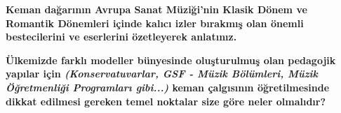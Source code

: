 \documentclass[a4paper,addpoints,12pt]{exam}
\begin{document}
\begin{center}
\end{center}
\vspace{0.1in}
\vspace{0.1in}
\vspace{0.1in}

\begin{questions}
\question[50]
\textbf{Keman dağarının Avrupa Sanat Müziği'nin Klasik Dönem ve Romantik Dönemleri içinde kalıcı izler bırakmış olan önemli bestecilerini ve eserlerini özetleyerek anlatınız.}


\makeemptybox{6.6in}

\break

\question[50]
\textbf{Ülkemizde farklı modeller bünyesinde oluşturulmuş olan pedagojik yapılar için \textit{(Konservatuvarlar, GSF - Müzik Bölümleri, Müzik Öğretmenliği Programları gibi...)} keman çalgısının öğretilmesinde dikkat edilmesi gereken temel noktalar size göre neler olmalıdır?}



\makeemptybox{7.9in}

\end{questions}
\end{document}
